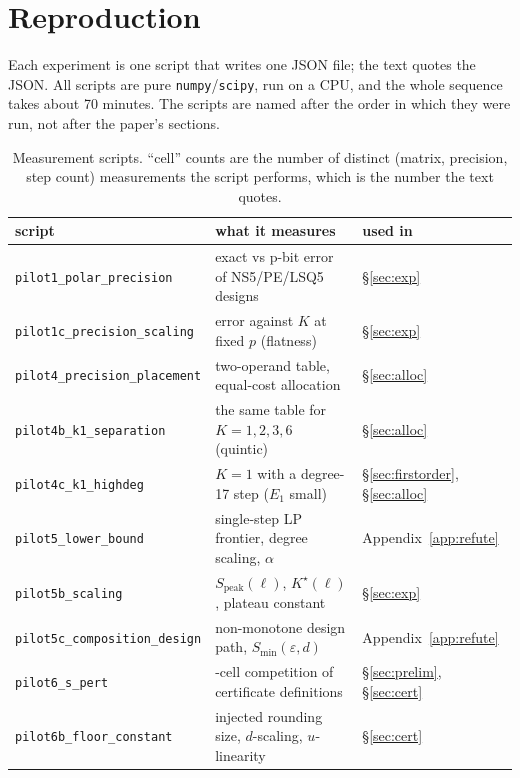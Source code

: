\appendix

\section{Reproduction}
\label{app:repro}

Each experiment is one script that writes one JSON file; the text quotes the JSON.
All scripts are pure \texttt{numpy}/\texttt{scipy}, run on a CPU, and the whole
sequence takes about 70 minutes.  The scripts are named after the order in which
they were run, not after the paper's sections.

\begin{table}[h]
\centering
\caption{Measurement scripts.  ``cell'' counts are the number of distinct
(matrix, precision, step count) measurements the script performs, which is the
number the text quotes.}
\label{tab:scripts}
\footnotesize
\setlength{\tabcolsep}{4pt}
\begin{tabular}{>{\raggedright\arraybackslash}p{5.6cm}
                >{\raggedright\arraybackslash}p{6.3cm}
                >{\raggedright\arraybackslash}p{3.4cm}}
\toprule
script & what it measures & used in \\
\midrule
\texttt{pilot1\_polar\_precision} & exact vs p-bit error of NS5/PE/LSQ5 designs & \S\ref{sec:exp} \\
\texttt{pilot1c\_precision\_scaling} & error against $K$ at fixed $p$ (flatness) & \S\ref{sec:exp} \\
\texttt{pilot4\_precision\_placement} & two-operand table, equal-cost allocation & \S\ref{sec:alloc} \\
\texttt{pilot4b\_k1\_separation} & the same table for $K=1,2,3,6$ (quintic) & \S\ref{sec:alloc} \\
\texttt{pilot4c\_k1\_highdeg} & $K=1$ with a degree-17 step ($E_1$ small) & \S\ref{sec:firstorder}, \S\ref{sec:alloc} \\
\texttt{pilot5\_lower\_bound} & single-step LP frontier, degree scaling, $\alpha$ & Appendix~\ref{app:refute} \\
\texttt{pilot5b\_scaling} & $S_{\mathrm{peak}}(\ell)$, $K^\star(\ell)$, plateau constant & \S\ref{sec:exp} \\
\texttt{pilot5c\_composition\_design} & non-monotone design path, $S_{\min}(\varepsilon,d)$ & Appendix~\ref{app:refute} \\
\texttt{pilot6\_s\_pert} & 192-cell competition of certificate definitions & \S\ref{sec:prelim}, \S\ref{sec:cert} \\
\texttt{pilot6b\_floor\_constant} & injected rounding size, $d$-scaling, $u$-linearity & \S\ref{sec:cert} \\

\end{tabular}
\end{table}
